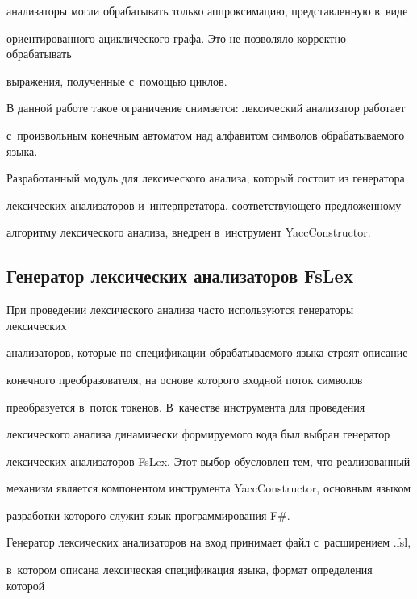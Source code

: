 анализаторы могли обрабатывать только аппроксимацию, представленную в~виде 


ориентированного ациклического графа. Это не позволяло корректно обрабатывать 


выражения, полученные с~помощью циклов.


    


В данной работе такое ограничение снимается: лексический анализатор работает 


с~произвольным конечным автоматом над алфавитом символов обрабатываемого языка. 


Разработанный модуль для лексического анализа, который состоит из генератора 


лексических анализаторов и~интерпретатора, соответствующего предложенному 


алгоритму лексического анализа, внедрен в~инструмент YaccConstructor.





\subsection{Генератор лексических анализаторов FsLex}





При проведении лексического анализа часто используются генераторы лексических 


анализаторов, которые по спецификации обрабатываемого языка строят описание 


конечного преобразователя, на основе которого входной поток символов 


преобразуется в~поток токенов. В~качестве инструмента для проведения 


лексического анализа динамически формируемого кода был выбран генератор 


лексических анализаторов FsLex. Этот выбор обусловлен тем, что реализованный 


механизм является компонентом инструмента YaccConstructor, основным языком 


разработки которого служит язык программирования F\#.





Генератор лексических анализаторов на вход принимает файл с~расширением .fsl, 


в~котором описана лексическая спецификация  языка, формат определения которой 


